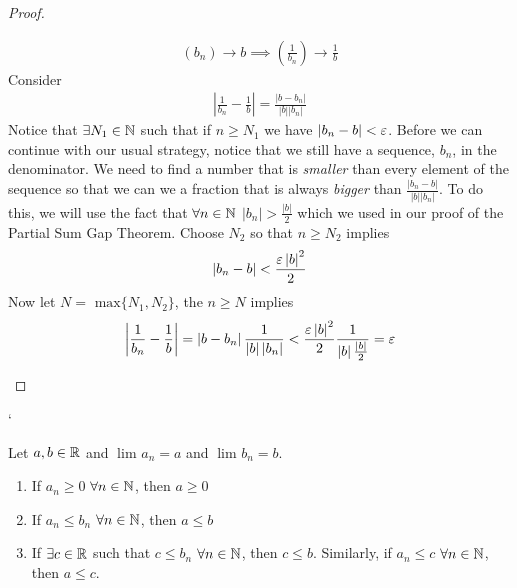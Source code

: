 \begin{proof}
\begin{alphabetize}
			\begin{align}
				\left( b_n \right) \to b \implies \left( \frac{1}{b_n} \right) \to \frac{1}{b}
			\end{align}
			Consider
			\begin{align}
				\left|\frac{1}{b_n} - \frac{1}{b}\right| = \frac{\left|b - b_n\right|}{\left|b\right|\left|b_n\right|}
			\end{align}
			Notice that $\exists N_1 \in \mathbb{N}$ such that if $n \ge N_1$ we have $\left|b_n - b\right| < \e$. Before we can continue with our usual strategy, notice that we still have a sequence, $b_n$, in the denominator. We need to find a number that is \textit{smaller} than every element of the sequence so that we can we a fraction that is always \textit{bigger} than $\frac{\left|b_n -b \right|}{\left|b\right|\left|b_n\right|}$. To do this, we will use the fact that $\forall n \in \mathbb{N}$ $\left|b_n\right| > \frac{\left|b\right|}{2}$ which we used in our proof of the Partial Sum Gap Theorem. Choose $N_2$ so that $n \ge N_2$ implies
			\begin{align}
				\left|b_n - b\right| < \frac{\e \left|b\right|^{2}}{2}
			\end{align}
			Now let $N = \text{ max}\{N_1, N_2\} $, the $n \ge N$ implies
			\begin{align}
				\left|\frac{1}{b_n} - \frac{1}{b}\right| = \left|b - b_n\right|\frac{1}{\left|b\right|\left|b_n\right|} < \frac{\e \left|b\right|^{2}}{2} \frac{1}{\left|b\right|\frac{\left|b\right|}{2}} = \e
			\end{align}
	\end{alphabetize}	
\end{proof}


`\begin{theorem}
        Let $a,b \in \mathbb{R}$ and $\lim_{} a_n = a$ and $\lim_{} b_n = b$.
        \begin{enumerate}
                \item If $a_n \ge 0$ $\forall n \in \mathbb{N}$, then $a \ge 0$
                \item If $a_n \le b_n$ $\forall n \in \mathbb{N}$, then $a \le b$
                \item If $\exists c \in \mathbb{R}$ such that $c \le b_n$ $\forall n \in \mathbb{N}$, then $c \le b$. Similarly, if $a_n \le c$ $\forall n \in \mathbb{N}$, then $a \le c$.
        \end{enumerate}
\end{theorem}

